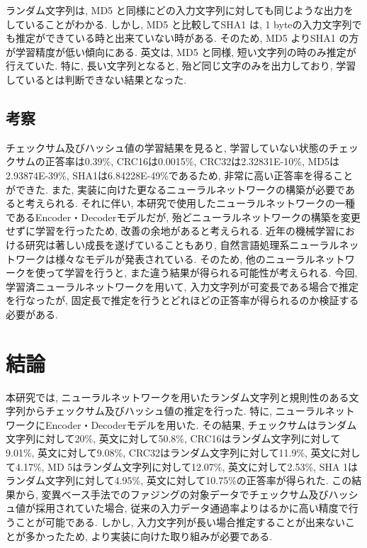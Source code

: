 \documentclass[11pt]{jbook}
\begin{document}
ランダム文字列は, MD5 と同様にどの入力文字列に対しても同じような出力をしていることがわかる.
しかし, MD5 と比較してSHA1 は, 1 byteの入力文字列でも推定ができている時と出来ていない時がある.
そのため, MD5 よりSHA1 の方が学習精度が低い傾向にある.
英文は, MD5 と同様, 短い文字列の時のみ推定が行えていた.
特に, 長い文字列となると, 殆ど同じ文字のみを出力しており, 学習しているとは判断できない結果となった.

\newpage

\section{考察}

チェックサム及びハッシュ値の学習結果を見ると, 学習していない状態のチェックサムの正答率は0.39\%, CRC16は0.0015\%, CRC32は2.32831E-10\%, MD5は2.93874E-39\%,
SHA1は6.84228E-49\%であるため, 非常に高い正答率を得ることができた.
また, 実装に向けた更なるニューラルネットワークの構築が必要であると考えられる.
それに伴い, 本研究で使用したニューラルネットワークの一種であるEncoder・Decoderモデル\cite{seq2seq}だが, 殆どニューラルネットワークの構築を変更せずに学習を行ったため, 改善の余地があると考えられる.
近年の機械学習における研究は著しい成長を遂げていることもあり, 自然言語処理系ニューラルネットワークは様々なモデルが発表されている.
そのため, 他のニューラルネットワークを使って学習を行うと, また違う結果が得られる可能性が考えられる.
今回, 学習済ニューラルネットワークを用いて, 入力文字列が可変長である場合で推定を行なったが, 固定長で推定を行うとどれほどの正答率が得られるのか検証する必要がある.



\chapter{結論}

本研究では, ニューラルネットワークを用いたランダム文字列と規則性のある文字列からチェックサム及びハッシュ値の推定を行った.
特に, ニューラルネットワークにEncoder・Decoderモデルを用いた.
その結果, チェックサムはランダム文字列に対して20\%, 英文に対して50.8\%, CRC16はランダム文字列に対して9.01\%, 英文に対して9.08\%, CRC32はランダム文字列に対して11.9\%, 英文に対して4.17\%,
MD 5はランダム文字列に対して12.07\%, 英文に対して2.53\%, SHA 1はランダム文字列に対して4.95\%, 英文に対して10.75\%の正答率が得られた.
この結果から, 変異ベース手法でのファジングの対象データでチェックサム及びハッシュ値が採用されていた場合, 従来の入力データ通過率よりはるかに高い精度で行うことが可能である.
しかし, 入力文字列が長い場合推定することが出来ないことが多かったため, より実装に向けた取り組みが必要である.
\end{document}
